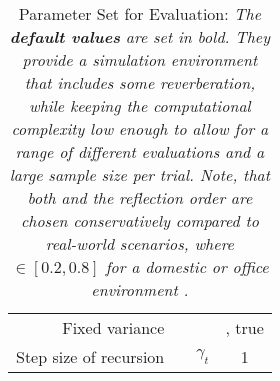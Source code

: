 \begin{table}[H]
\begin{tabular}{rccc}
		Fixed variance                 &      &                  & {false}, true          \\
		Step size of recursion         &      & $\gamma_t$                 & 1         \\
		\bottomrule
	\end{tabular}
	\caption[Parameter Set for Evaluation]{Parameter Set for Evaluation: \itshape The \textbf{default values} are set in bold. They provide a simulation environment that includes some reverberation, while keeping the computational complexity low enough to allow for a range of different evaluations and a large sample size per trial. Note, that both \Tsixty and the reflection order are chosen conservatively compared to real-world scenarios, where \Tsixty$\in [0.2, 0.8]$ for a domestic or office environment \cite[p.695]{Gannot2017}.}
	\label{table:parameterset}
\end{table}
